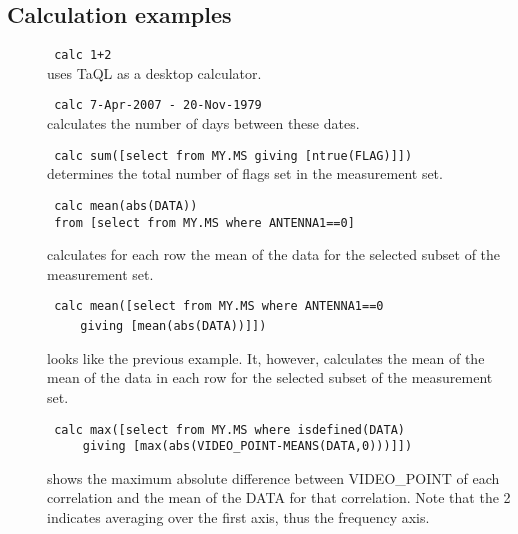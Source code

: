 \subsection{\label{TAQL:CALCEXAMPLES}Calculation examples}
\begin{description}
  \item[] \texttt{ calc 1+2 }
      \\uses TaQL as a desktop calculator.

  \item[] \texttt{ calc 7-Apr-2007 - 20-Nov-1979 }
      \\calculates the number of days between these dates.

  \item[] \texttt{ calc sum([select from MY.MS giving [ntrue(FLAG)]]) }
      \\determines the total number of flags set in the measurement set.

  \item[] \texttt{ calc mean(abs(DATA)) }
          \\\texttt{ from [select from MY.MS where ANTENNA1==0] }

        calculates for each row the mean of the data for the selected
        subset of the measurement set.

  \item[] \texttt{ calc mean([select from MY.MS where ANTENNA1==0 }
     \\\verb=    =
     \texttt{giving [mean(abs(DATA))]]) }

        looks like the previous example. It, however, calculates the
        mean of the mean of the data in each row for the selected
        subset of the measurement set.

  \item[] \texttt{ calc max([select from MY.MS where isdefined(DATA) }
     \\\verb=    =
     \texttt{ giving [max(abs(VIDEO\_POINT-MEANS(DATA,0)))]]) }

        shows the maximum absolute difference between VIDEO\_POINT of
        each correlation and the mean of the DATA for that correlation.
        Note that the 2 indicates averaging over the first axis,
        thus the frequency axis.

\end{description}

